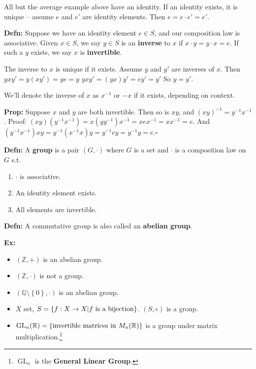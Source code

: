 \documentclass[10pt,letterpaper]{article}
\newcommand{\n}{\hfill\break}
\newcommand{\defn}[1]{\par\noindent\settowidth{\hangindent}{\textbf{Defn: }}\textbf{Defn: }#1\n}
\newcommand{\prop}[1]{\par\noindent\settowidth{\hangindent}{\textbf{Prop: }}\textbf{Prop: }#1\n}
\newcommand{\ex}[1]{\par\noindent\settowidth{\hangindent}{\textbf{Ex: }}\textbf{Ex: }#1\n}
\newcommand{\proven}{\;$\square$\n}
\newcommand{\ptxt}[1]{\textrm{\textnormal{#1}}}
\newcommand{\set}[1]{\left\{#1\right\}}
\newcommand{\integers}{\mathbb{Z}}
\newcommand{\Z}{\integers}
\newcommand{\rationals}{\mathbb{Q}}
\newcommand{\Q}{\rationals}
\newcommand{\reals}{\mathbb{R}}
\newcommand{\R}{\reals}
\newcommand{\cut}{\setminus}
\newcommand{\inv}{^{-1}}
\newcommand{\of}{\circ}
\DeclareMathOperator{\GL}{GL}
\newcommand{\st}{s.t.}
\begin{document}
\par\noindent
All but the average example above have an identity. If an identity exists, it is unique -- assume $e$ and $e'$ are identity elements. Then $e=e\cdot{}e'=e'$.\n

\defn{\!\!\!
	Suppose we have an identity element $e\in{}S$, and our composition law is associative. Given $x\in{}S$, we say $y\in{}S$ is an \textbf{inverse} to $x$ if $x\cdot{}y=y\cdot{}x=e$. If such a $y$ exists, we say $x$ is \textbf{invertible}.
}

\par\noindent
The inverse to $x$ is unique if it exists. Assume $y$ and $y'$ are inverses of $x$. Then\n
$yxy'=y(xy')=ye=y$\n
$yxy'=(yx)y'=ey'=y'$\n
So $y=y'$.\n

\par\noindent
We'll denote the inverse of $x$ as $x\inv$ or $-x$ if it exists, depending on context.\n

\prop{\!\!\!
	Suppose $x$ and $y$ are both invertible. Then so is $xy$, and $(xy)\inv=y\inv{}x\inv$.\n
	Proof: $(xy)(y\inv{}x\inv)=x(yy\inv)x\inv=xex\inv=xx\inv=e$.\n
	And $(y\inv{}x\inv)xy=y\inv(x\inv{}x)y=y\inv{}ey=y\inv{}y=e$.\proven
}

\defn{\!\!\!
	A \textbf{group} is a pair $(G,\cdot)$ where $G$ is a set and $\cdot$ is a composition law on $G$ \st{}
	\begin{enumerate}
		\item $\cdot$ is associative.
		\item An identity element exists.
		\item All elements are invertible.
	\end{enumerate}
}

\defn{\!\!\!
	A commutative group is also called an \textbf{abelian group}.
}

\ex{\!\!\!
	\begin{itemize}
		\item $(\Z,+)$ is an abelian group.
		\item $(\Z,\cdot)$ is not a group.
		\item $(\Q\cut\set{0},\cdot)$ is an abelian group.
		\item $X$ set, $S=\set{f:X\to{}X|f\ptxt{ is a bijection}}$. $(S,\of)$ is a group.
		\item $\GL_{n}(\R)=\set{\ptxt{invertible matrices in }M_{n}(\R)}$ is a group under matrix multiplication.\footnote{$\GL_{n}$ is the \textbf{General Linear Group}.}
	\end{itemize}
}
\end{document}
